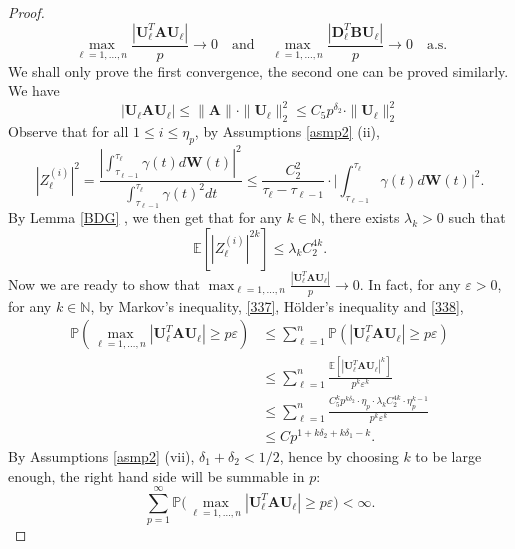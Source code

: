 \documentclass[a4paper,11pt]{book}
\theoremstyle{plain}
\theoremstyle{definition}
\newcommand{\ME}{\mathbb{E}}
\newcommand{\MP}{\mathbb{P}}
\newcommand{\MN}{\mathbb{N}}
\begin{document}
\begin{proof}
    	\[ \max_{\ell = 1, \dots, n} \frac{| \mathbf{U}_\ell^T \mathbf{A} \mathbf{U}_\ell |}{p} \rightarrow 0 \quad \text{and} \quad \max_{\ell = 1, \dots, n} \frac{| \mathbf{D}_\ell^T \mathbf{B} \mathbf{U}_\ell |}{p} \rightarrow 0 \quad \text{a.s.} \]
    	We shall only prove the first convergence, the second one can be proved similarly. We have
    	\begin{equation} \label{337}
    		|\mathbf{U}_\ell \mathbf{A} \mathbf{U}_\ell| \leq \|\mathbf{A}\| \cdot \|\mathbf{U}_\ell\|_2^2 \leq C_5 p^{\delta_2} \cdot \|\mathbf{U}_\ell\|_2^2
    	\end{equation}
    	Observe that for all $1 \leq i \leq \eta_p$, by Assumptions \ref{asmp2} (ii),
    	\[ | Z_\ell^{(i)} |^2 = \frac{|\int_{\tau_{\ell-1}}^{\tau_\ell} \gamma(t) d\mathbf{W}(t)|^2}{\int_{\tau_{\ell-1}}^{\tau_\ell} \gamma(t)^2 dt} \leq \frac{C_2^2}{\tau_\ell-\tau_{\ell-1} } \cdot \Bigg|\int_{\tau_{\ell-1}}^{\tau_\ell} \gamma(t) d\mathbf{W}(t) \Bigg|^2. \] 
    	By Lemma \ref{BDG} , we then get that for any $k \in \MN$, there exists $\lambda_k > 0$ such that
    	\begin{equation} \label{338}
    		\ME[ |Z_\ell^{(i)}|^{2k} ] \leq \lambda_k C_2^{4k}.
    	\end{equation}
    	Now we are ready to show that $\max_{\ell = 1, \dots, n} \frac{| \mathbf{U}_\ell^T \mathbf{A} \mathbf{U}_\ell |}{p} \rightarrow 0 $. In fact, for any $\varepsilon > 0$, for any $k \in \MN$, by Markov's inequality, \eqref{337}, H\"older's inequality and \eqref{338},
    	\[ 
    	\begin{aligned}
    	\MP(\max_{\ell = 1, \dots, n} | \mathbf{U}_\ell^T \mathbf{A} \mathbf{U}_\ell | \geq p\varepsilon) & \leq \sum_{\ell=1}^{n} \MP(|\mathbf{U}_\ell^T \mathbf{A} \mathbf{U}_\ell | \geq p\varepsilon) \\
    	& \leq \sum_{\ell=1}^{n} \frac{\ME[ |\mathbf{U}_\ell^T \mathbf{A} \mathbf{U}_\ell|^k ]}{ p^k \varepsilon^k } \\
    	& \leq \sum_{\ell=1}^{n} \frac{ C_5^k p^{k \delta_2}  \cdot \eta_p \cdot \lambda_k C_2^{4k} \cdot \eta_p^{k-1} }{p^k\varepsilon^k} \\
    	& \leq C p^{1+k\delta_2 + k\delta_1 - k}.
    	\end{aligned}
    	 \]
    	 By Assumptions \ref{asmp2} (vii), $\delta_1 + \delta_2 < 1/2$, hence by choosing $k$ to be large enough, the right hand side will be summable in $p$: 
    	 \[ \sum_{p=1}^{\infty} \MP\big(\max_{\ell = 1, \dots, n} | \mathbf{U}_\ell^T \mathbf{A} \mathbf{U}_\ell | \geq p\varepsilon\big) < \infty. \]

\end{proof}
\end{document}
